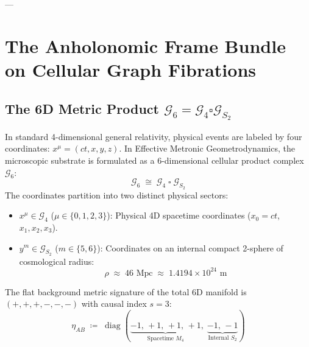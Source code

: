 \documentclass[
    12pt,
    a4paper,
    headings=normal,
    twoside=false,
    open=any,
    parskip=half
]{scrbook}
\DeclareMathOperator{\diag}{diag}
\begin{document}
---

\section{The Anholonomic Frame Bundle on Cellular Graph Fibrations}
\label{sec:ch2_fibration_geometry}

\subsection{The 6D Metric Product $\mathcal{G}_6 = \mathcal{G}_4 \square \mathcal{G}_{S_2}$}

In standard 4-dimensional general relativity, physical events are labeled by four coordinates: $x^\mu = (ct, x, y, z)$. In Effective Metronic Geometrodynamics, the microscopic substrate is formulated as a 6-dimensional cellular product complex $\mathcal{G}_6$:
\begin{equation}
\mathcal{G}_6 \;\cong\; \mathcal{G}_4 \;\square\; \mathcal{G}_{S_2}
\label{eq:ch2_cartesian_fibration}
\end{equation}
The coordinates partition into two distinct physical sectors:
\begin{itemize}[leftmargin=2em]
    \item $x^\mu \in \mathcal{G}_4$ ($\mu \in \{0, 1, 2, 3\}$): Physical 4D spacetime coordinates ($x_0 = ct$, $x_1, x_2, x_3$).
    \item $y^m \in \mathcal{G}_{S_2}$ ($m \in \{5, 6\}$): Coordinates on an internal compact 2-sphere of cosmological radius:
    \begin{equation}
    \rho \;\approx\; 46 \text{ Mpc} \;\approx\; 1.4194 \times 10^{24} \text{ m}
    \label{eq:ch2_rho_definition}
    \end{equation}
\end{itemize}

The flat background metric signature of the total 6D manifold is $(+,+,+,-,-,-)$ with causal index $s = 3$:
\begin{equation}
\eta_{AB} \;\coloneqq\; \diag\left( \underbrace{-1, \, +1, \, +1, \, +1}_{\text{Spacetime } M_4}, \; \underbrace{-1, \, -1}_{\text{Internal } S_2} \right)
\label{eq:ch2_eta_6d_signature}
\end{equation}
\end{document}
